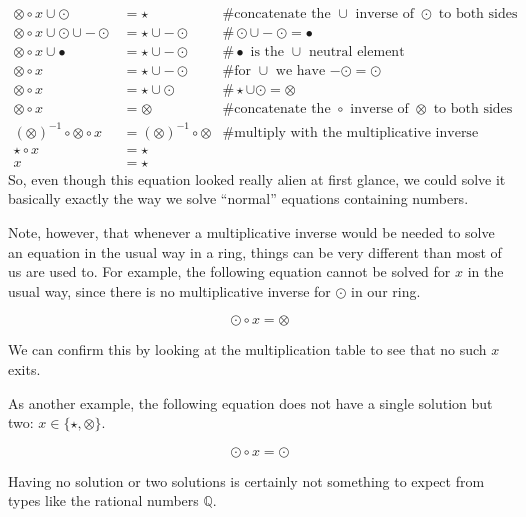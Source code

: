 \begin{example}
\begin{align*}
\otimes \circ x \cup \odot  &= \star & \text{\# concatenate the $\cup$ inverse of $\odot$ to both sides}\\
\otimes \circ x \cup \odot \cup -\odot  &= \star \cup -\odot & \# \odot \cup -\odot = \bullet\\
\otimes \circ x \cup \bullet &= \star \cup -\odot & \text{\# $\bullet$ is the $\cup$ neutral element}\\
\otimes \circ x &= \star \cup -\odot & \text{\# for $\cup$ we have $-\odot = \odot$} \\
\otimes \circ x &= \star \cup \odot &\# \star \cup \odot = \otimes \\
\otimes \circ x &= \otimes  &\text{\# concatenate the $\circ$ inverse of $\otimes$ to both sides}\\
(\otimes)^{-1}\circ \otimes \circ x &= (\otimes)^{-1}\circ \otimes & \text{\# multiply with the multiplicative inverse}\\
\star \circ x &= \star\\
x &= \star
\end{align*}
So, even though this equation looked really alien at first glance, we could solve it basically exactly the way we solve ``normal'' equations containing numbers.

Note, however, that whenever a multiplicative inverse would be needed to solve an equation in the usual way in a ring, things can be very different than most of us are used to.  For example, the following equation cannot be solved for $x$ in the usual way, since there is no multiplicative inverse for $\odot$ in our ring.

\begin{equation}
\odot \circ x = \otimes
\end{equation}

We can confirm this by looking at the multiplication table to see that no such $x$ exits.

As another example, the following equation does not have a single solution but two: $x\in\{\star, \otimes\}$.

\begin{equation}
\odot \circ x = \odot
\end{equation}

Having no solution or two solutions is certainly not something to expect from types like the rational numbers $\mathbb{Q}$.
\end{example}

